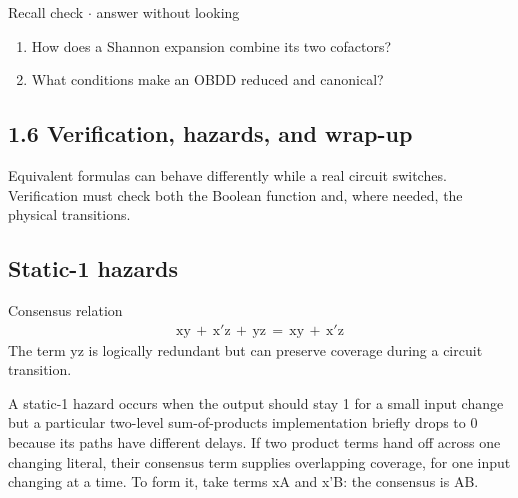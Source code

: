 \documentclass[11pt]{article}
\begin{document}
\begin{keepsection}
\begin{recallbox}{Recall check \ensuremath{\cdot} answer without looking}
\begin{enumerate}
\item How does a Shannon expansion combine its two cofactors?
\item What conditions make an OBDD reduced and canonical?
\end{enumerate}

\end{recallbox}
\end{keepsection}

\begin{keepsection}
\section{1.6 Verification, hazards, and wrap-up}

Equivalent formulas can behave differently while a real circuit switches. Verification must check both the Boolean function and, where needed, the physical transitions.

\begin{keepsection}
\subsection{Static-1 hazards}

\begin{equationcard}{Consensus relation}
\[ \begin{gathered} \text{xy}\, +\, \mathrm{x}'\mathrm{z}\, +\, \text{yz}\, =\, \text{xy}\, +\, \mathrm{x}'\mathrm{z} \end{gathered} \]
{\small The term yz is logically redundant but can preserve coverage during a circuit transition.}
\end{equationcard}

A static-1 hazard occurs when the output should stay 1 for a small input change but a particular two-level sum-of-products implementation briefly drops to 0 because its paths have different delays. If two product terms hand off across one changing literal, their consensus term supplies overlapping coverage, for one input changing at a time. To form it, take terms xA and x'B: the consensus is AB.


\end{keepsection}
\end{keepsection}
\end{document}
